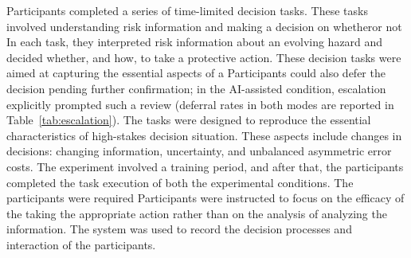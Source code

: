 \documentclass[journal]{IEEEtran}
\theoremstyle{plain}
\theoremstyle{definition}
\providecommand{\DIFaddtex}[1]{{\protect\color{blue} \sf #1}} %
\providecommand{\DIFdeltex}[1]{{\protect\color{red} \scriptsize #1}} %
\providecommand{\DIFaddbegin}{} %
\providecommand{\DIFaddend}{} %
\providecommand{\DIFdelbegin}{} %
\providecommand{\DIFdelend}{} %
\providecommand{\DIFadd}[1]{\texorpdfstring{\DIFaddtex{#1}}{#1}} %
\providecommand{\DIFdel}[1]{\texorpdfstring{\DIFdeltex{#1}}{}} %
\newcommand{\DIFscaledelfig}{0.5}
\newlength{\DIFdelgraphicswidth} %
\newlength{\DIFdelgraphicsheight} %
\newcommand{\DIFaddincludegraphics}[2][]{{\color{blue}\fbox{\DIFOincludegraphics[#1]{#2}}}} %
\newcommand{\DIFdelincludegraphics}[2][]{%
\sbox{\DIFdelgraphicsbox}{\DIFOincludegraphics[#1]{#2}}%
\settoboxwidth{\DIFdelgraphicswidth}{\DIFdelgraphicsbox} %
\settoboxtotalheight{\DIFdelgraphicsheight}{\DIFdelgraphicsbox} %
\scalebox{\DIFscaledelfig}{%
\parbox[b]{\DIFdelgraphicswidth}{\usebox{\DIFdelgraphicsbox}\\[-\baselineskip] \rule{\DIFdelgraphicswidth}{0em}}\llap{\resizebox{\DIFdelgraphicswidth}{\DIFdelgraphicsheight}{%
\setlength{\unitlength}{\DIFdelgraphicswidth}%
\begin{picture}(1,1)%
\thicklines\linethickness{2pt} %
{\color[rgb]{1,0,0}\put(0,0){\framebox(1,1){}}}%
{\color[rgb]{1,0,0}\put(0,0){\line( 1,1){1}}}%
{\color[rgb]{1,0,0}\put(0,1){\line(1,-1){1}}}%
\end{picture}%
}\hspace*{3pt}}} %
} %
\DeclareRobustCommand{\DIFaddbegin}{\DIFOaddbegin \let\includegraphics\DIFaddincludegraphics} %
\DeclareRobustCommand{\DIFaddend}{\DIFOaddend \let\includegraphics\DIFOincludegraphics} %
\DeclareRobustCommand{\DIFdelbegin}{\DIFOdelbegin \let\includegraphics\DIFdelincludegraphics} %
\DeclareRobustCommand{\DIFdelend}{\DIFOaddend \let\includegraphics\DIFOincludegraphics} %
\begin{document}
    \DIFadd{Participants completed a series of time-limited }\DIFaddend decision tasks. \DIFdelbegin \DIFdel{These tasks involved understanding risk information and making a decision on whetheror not }\DIFdelend \DIFaddbegin \DIFadd{In each task, they interpreted risk information about an evolving hazard and decided whether, and how, }\DIFaddend to take a protective action. \DIFdelbegin \DIFdel{These decision tasks were aimed at capturing the essential aspects of a }\DIFdelend \DIFaddbegin \DIFadd{Participants could also defer the decision pending further confirmation; in the AI-assisted condition, escalation explicitly prompted such a review (deferral rates in both modes are reported in Table~\ref{tab:escalation}). The tasks were designed to reproduce the essential characteristics of }\DIFaddend high-stakes \DIFdelbegin \DIFdel{decision situation. These aspects include changes in }\DIFdelend \DIFaddbegin \DIFadd{decisions: changing }\DIFaddend information, uncertainty, and \DIFdelbegin \DIFdel{unbalanced }\DIFdelend \DIFaddbegin \DIFadd{asymmetric }\DIFaddend error costs. \DIFdelbegin \DIFdel{The experiment involved a training period, and after that, the participants completed the task execution of both the experimental conditions. The participants were required }\DIFdelend \DIFaddbegin \DIFadd{Participants were instructed }\DIFaddend to focus on \DIFdelbegin \DIFdel{the efficacy of the }\DIFdelend \DIFaddbegin \DIFadd{taking the appropriate }\DIFaddend action rather than on \DIFdelbegin \DIFdel{the analysis of }\DIFdelend \DIFaddbegin \DIFadd{analyzing }\DIFaddend the information.
\DIFdelbegin \DIFdel{The system was used to record the decision processes and interaction of the participants. }%

\end{document}
